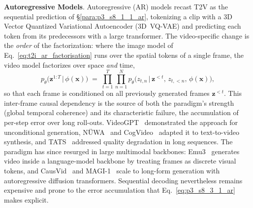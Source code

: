 \noindent \textbf{Autoregressive Models}. Autoregressive (AR) models recast T2V as the sequential prediction of §\ref{para:p3_s8_1_1_ar}, tokenizing a clip with a 3D Vector Quantized Variational Autoencoder (3D~VQ-VAE) and predicting each token from its predecessors with a large transformer. The video-specific change is the \emph{order} of the factorization: where the image model of Eq.~\eqref{eq:t2i_ar_factorisation} runs over the spatial tokens of a single frame, the video model factorizes over space \emph{and} time,
\begin{equation}
p_\theta\!\big(\mathbf{z}^{1:T}\,\big|\,\phi(\mathbf{x})\big)\;=\;\prod_{t=1}^{T}\prod_{n=1}^{N} p_\theta\!\big(z_{t,n}\,\big|\,\mathbf{z}^{<t},\,z_{t,<n},\,\phi(\mathbf{x})\big),
\label{eq:p3_s8_3_1_ar}
\end{equation}
so that each frame is conditioned on all previously generated frames $\mathbf{z}^{<t}$. This inter-frame causal dependency is the source of both the paradigm's strength (global temporal coherence) and its characteristic failure, the accumulation of per-step error over long roll-outs. VideoGPT~\cite{yan2021videogpt} demonstrated the approach for unconditional generation, N\"{U}WA~\cite{wu2022nuwa} and CogVideo~\cite{hong2022cogvideo} adapted it to text-to-video synthesis, and TATS~\cite{ge2022long} addressed quality degradation in long sequences. The paradigm has since resurged in large multimodal backbones: Emu3~\cite{wang2024emu3} generates video inside a language-model backbone by treating frames as discrete visual tokens, and CausVid~\cite{yin2025slow} and MAGI-1~\cite{ai2025magi1autoregressivevideogeneration} scale to long-form generation with autoregressive diffusion transformers. Sequential decoding nevertheless remains expensive and prone to the error accumulation that Eq.~\eqref{eq:p3_s8_3_1_ar} makes explicit.


